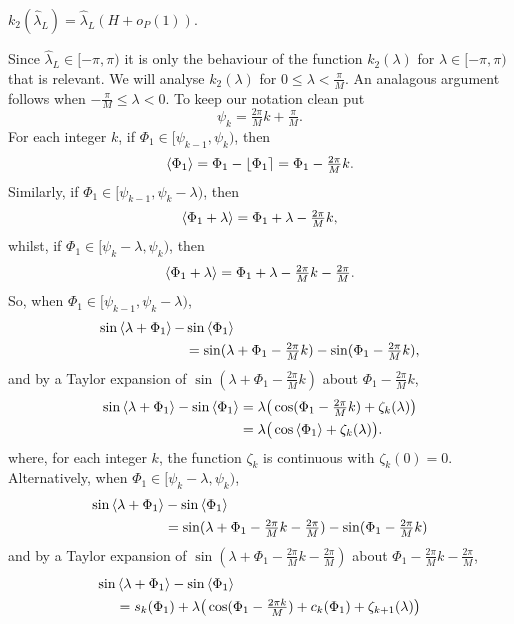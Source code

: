 \documentclass[journal]{IEEEtran}
\begin{document}
\begin{lemma}\label{lem:k2conv}
$k_2(\hat{\lambda}_L) = \hat{\lambda}_L ( H + o_P(1) ).$
\end{lemma}
\begin{IEEEproof}
Since $\hat{\lambda}_L \in [-\pi, \pi)$ it is only the behaviour of the function $k_2(\lambda)$ for $\lambda\in [-\pi, \pi)$ that is relevant.  We will analyse $k_2(\lambda)$ for $0 \leq \lambda < \tfrac{\pi}{M}$.  An analagous argument follows when $-\tfrac{\pi}{M} \leq \lambda < 0$.  To keep our notation clean put
\[
\psi_k = \tfrac{2\pi}{M}k + \tfrac{\pi}{M}.
\]
For each integer $k$, if $\Phi_1 \in [\psi_{k-1}, \psi_k)$, then
\[
\left\langle \Phi_1 \right\rangle = \Phi_1 - {\left\lfloor \Phi_1 \right\rceil} = \Phi_1 - \tfrac{2\pi}{M}k.
\]
Similarly, if $\Phi_1 \in  [\psi_{k-1}, \psi_{k} - \lambda)$, then
\[
\left\langle \Phi_1 + \lambda \right\rangle = \Phi_1 + \lambda - \tfrac{2\pi}{M}k,
\]
whilst, if $\Phi_1 \in [\psi_{k} - \lambda, \psi_{k})$, then
\[
\left\langle \Phi_1 + \lambda \right\rangle = \Phi_1 + \lambda - \tfrac{2\pi}{M}k - \tfrac{2\pi}{M}.
\]
So, when $\Phi_1 \in [\psi_{k-1}, \psi_{k} - \lambda )$,
\begin{align*}
\sin\left\langle \lambda + \Phi_1 \right\rangle - &\sin\left\langle \Phi_1 \right\rangle \\
&= \sin(\lambda + \Phi_1 - \tfrac{2\pi}{M}k) - \sin(\Phi_1 - \tfrac{2\pi}{M}k),
\end{align*}
and by a Taylor expansion of $\sin(\lambda + \Phi_1 - \tfrac{2\pi}{M}k)$ about $\Phi_1 - \tfrac{2\pi}{M}k$, 
\begin{align*}
\sin\left\langle \lambda + \Phi_1 \right\rangle - \sin\left\langle \Phi_1 \right\rangle &= \lambda\big(\cos(\Phi_1 - \tfrac{2\pi}{M}k) + \zeta_k(\lambda)\big) \\
&= \lambda\big(\cos\left\langle \Phi_1 \right\rangle + \zeta_k(\lambda)\big).
\end{align*}
where, for each integer $k$, the function $\zeta_k$ is continuous with $\zeta_k(0) = 0$.  Alternatively, when $\Phi_1 \in [ \psi_{k} - \lambda,\psi_{k})$,
\begin{align*}
\sin\left\langle \lambda + \Phi_1 \right\rangle &- \sin\left\langle \Phi_1 \right\rangle \\
&= \sin(\lambda + \Phi_1 - \tfrac{2\pi}{M}k - \tfrac{2\pi}{M}) - \sin(\Phi_1 - \tfrac{2\pi}{M}k)
\end{align*}
and by a Taylor expansion of $\sin(\lambda + \Phi_1 - \tfrac{2\pi}{M}k - \tfrac{2\pi}{M})$ about $\Phi_1 - \tfrac{2\pi}{M}k - \tfrac{2\pi}{M}$,
\begin{align*}
\sin&\fracpart{\lambda + \Phi_1} - \sin\fracpart{\Phi_1} \\
&= s_k(\Phi_1) + \lambda\big(\cos(\Phi_1 - \tfrac{2\pi k}{M}) + c_k(\Phi_1) + \zeta_{k+1}(\lambda)\big)

\end{align*}
\end{IEEEproof}
\end{document}
